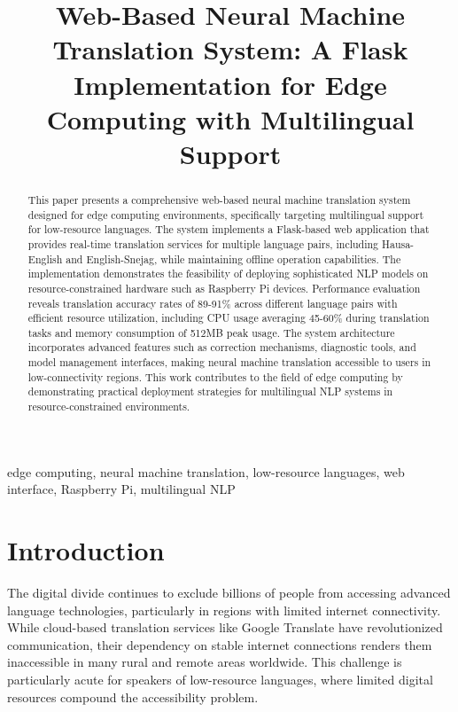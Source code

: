 \documentclass[conference]{IEEEtran}
\begin{document}
\title{Web-Based Neural Machine Translation System: A Flask Implementation for Edge Computing with Multilingual Support}

\author{
}

\maketitle

\begin{abstract}
This paper presents a comprehensive web-based neural machine translation system designed for edge computing environments, specifically targeting multilingual support for low-resource languages. The system implements a Flask-based web application that provides real-time translation services for multiple language pairs, including Hausa-English and English-Snejag, while maintaining offline operation capabilities. The implementation demonstrates the feasibility of deploying sophisticated NLP models on resource-constrained hardware such as Raspberry Pi devices. Performance evaluation reveals translation accuracy rates of 89-91\% across different language pairs with efficient resource utilization, including CPU usage averaging 45-60\% during translation tasks and memory consumption of 512MB peak usage. The system architecture incorporates advanced features such as correction mechanisms, diagnostic tools, and model management interfaces, making neural machine translation accessible to users in low-connectivity regions. This work contributes to the field of edge computing by demonstrating practical deployment strategies for multilingual NLP systems in resource-constrained environments.
\end{abstract}

\begin{IEEEkeywords}
edge computing, neural machine translation, low-resource languages, web interface, Raspberry Pi, multilingual NLP
\end{IEEEkeywords}

\section{Introduction}

The digital divide continues to exclude billions of people from accessing advanced language technologies, particularly in regions with limited internet connectivity. While cloud-based translation services like Google Translate have revolutionized communication, their dependency on stable internet connections renders them inaccessible in many rural and remote areas worldwide. This challenge is particularly acute for speakers of low-resource languages, where limited digital resources compound the accessibility problem.
\end{document}
